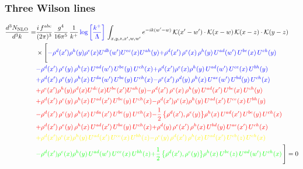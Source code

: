 \documentclass[9pt]{article}
\numberwithin{equation}{section}
\begin{document}
\subsubsection{Three Wilson lines}
\begin{align}
\frac{d^{3}N_{\rm NLO}}{d^{3}k}= &\frac{i\,f^{abc}}{(2\pi)^{3}}\,\frac{g^{4}}{16\pi^{5}}\,\frac{1}{k^{+}}\,{\color{blue}\log{\left[\frac{k^{+}}{\Lambda}\right]}}\,\int_{x,y,z,x',w,w'}e^{-ik(w'-w)}\,\mathcal{K}(x'-w')\cdot\mathcal{K}(x-w)\,\mathcal{K}(x-z)\cdot\mathcal{K}(y-z)\notag\\
&\times\Bigg[{\color{blue}-\rho^{d}(x') \rho^{h}(y) \rho^{e}(x) U^{d b}(w') U^{e c}(x) U^{a h}(y)} {\color{blue}+\rho^{d}(x')\,\rho^{e}(x)\,\rho^{h}(y)\,U^{ad}(w')\,U^{be}(x)\,U^{ch}(y)} \notag \\ &{\color{blue}-\rho^{d}(x')\,\rho^{e}(y)\,\rho^{h}(x)\,U^{ad}(w')\,U^{be}(y)\,U^{ch}(x)}{\color{blue}+\rho^{d}(x')\rho^{e}(x)\rho^{h}(y)\, U^{ad}(w')\,U^{ce}(x)\, U^{bh}(y)}\notag \\ &{\color{blue}+\rho^{d}(x')\, \rho^{e}(y)\,\rho^{h}(x)\, U^{da}(w')\,U^{be}(y)\,U^{ch}(x)}{\color{blue}-\rho^{e}(x')\,\rho^{d}(y)\,\rho^{h}(x)\,U^{ae}(w')\,U^{bd}(y)\,U^{ch}(x)}\notag \\ &{\color{red}+\rho^{e}(x') \rho^{h}(y) \rho^{d}(x) U^{d c}(x) U^{b e}(x') U^{a h}(y)}{\color{red}-\rho^{d}(x')\,\rho^{e}(x)\,\rho^{h}(y)\,U^{ad}(x')\,U^{be}(x)\,U^{ch}(y)}\notag \\ &{\color{red}+\rho^{d}(x')\,\rho^{e}(y)\,\rho^{h}(x)\,U^{ad}(x')\,U^{be}(y)\,U^{ch}(x)}{\color{red}-\rho^{d}(x')\rho^{e}(x)\rho^{h}(y)\, U^{ad}(x')\,U^{ce}(x)\, U^{bh}(y)}\notag \\ &{\color{red}-\rho^{d}(x')\, \rho^{e}(y)\,\rho^{h}(x)\, U^{da}(x')\,U^{be}(y)\,U^{ch}(x)}{\color{red}-\frac{1}{2}\,\big\{\rho^{d}(x'),\rho^{e}(y)\big\}\rho^{h}(x)\,U^{ad}(x')\,U^{be}(y)\,U^{ch}(x)}\notag \\ & {\color{red}+\rho^{d}(x')\,\rho^{e}(y)\,\rho^{h}(x)\,U^{ad}(x')\,U^{be}(y)\,U^{ch}(x)}{\color{red}+\rho^{d}(y)\,\rho^{e}(x')\,\rho^{h}(x)\,U^{bd}(y)\,U^{ae}(x')\,U^{ch}(x)}\notag \\ & {\color{yellow}+\rho^{d}(x')\rho^{e}(x)\rho^{h}(y)\, U^{ad}(x')\,U^{ce}(x)\, U^{bh}(z)}{\color{yellow}-\rho^{e}(y)\,\rho^{d}(x')\,\rho^{h}(x)\,U^{ad}(x')\,U^{eb}(z)\,U^{ch}(x)}\notag \\
&{\color{green}-\rho^{d}(x')\rho^{e}(x)\rho^{h}(y)\, U^{ad}(w')\,U^{ce}(x)\, U^{bh}(z)}{\color{green}+\frac{1}{2}\,\big\{\rho^{d}(x'),\rho^{e}(y)\big\}\rho^{h}(x)\,U ^{be}(z)\,U^{ad}(w')\,U^{ch}(x)}\,\Bigg] = 0 
\end{align}
\end{document}
